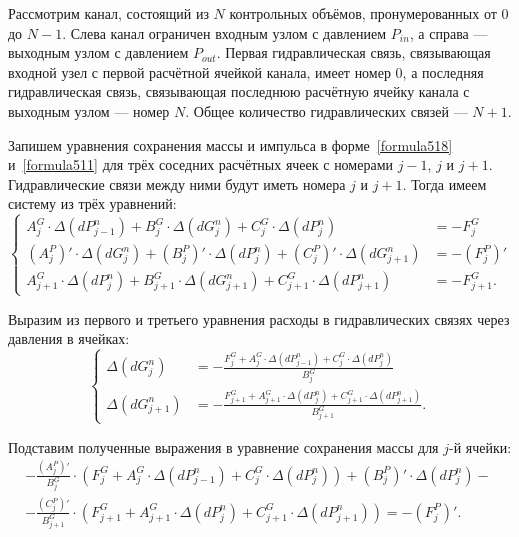 
\label{sec:subsection61}
Рассмотрим канал, состоящий из $N$ контрольных объёмов, пронумерованных от $0$ до $N-1$. Слева канал ограничен входным узлом с давлением $P_{in}$, а справа --- выходным узлом с давлением $P_{out}$. Первая гидравлическая связь, связывающая входной узел с первой расчётной ячейкой канала, имеет номер $0$, а последняя гидравлическая связь, связывающая последнюю расчётную ячейку канала с выходным узлом --- номер $N$. Общее количество гидравлических связей --- $N+1$.    

Запишем уравнения сохранения массы и импульса в форме~\eqref{formula518} и~\eqref{formula511} для трёх соседних расчётных ячеек с номерами $j-1$, $j$ и $j+1$. Гидравлические связи между ними будут иметь номера $j$ и $j+1$. Тогда имеем систему из трёх уравнений:
\begin{equation}
\label{formula61}
\left\{
\begin{aligned}
A_j^G \cdot \Delta(dP_{j-1}^n)+B_j^G \cdot \Delta(dG_j^n) + C_j^G \cdot \Delta(dP_j^n) & = -F_j^G \\
\left(A_j^P \right)' \cdot \Delta(dG_j^n) + \left(B_j^P \right)' \cdot \Delta(dP_j^n) + \left(C_j^P \right)' \cdot \Delta(dG_{j+1}^n) & = -\left(F_j^P \right)' \\
A_{j+1}^G \cdot \Delta(dP_j^n)+B_{j+1}^G \cdot \Delta(dG_{j+1}^n) + C_{j+1}^G \cdot \Delta(dP_{j+1}^n) & = -F_{j+1}^G.
\end{aligned}
\right.
\end{equation}

Выразим из первого и третьего уравнения расходы в гидравлических связях через давления в ячейках:
\begin{equation}
\label{formula62}
\left\{
\begin{aligned}
\Delta(dG_j^n) & = -\frac{F_j^G+A_j^G \cdot \Delta(dP_{j-1}^n)+C_j^G \cdot \Delta(dP_j^n)}{B_j^G} \\
\Delta(dG_{j+1}^n) & = -\frac{F_{j+1}^G+A_{j+1}^G \cdot \Delta(dP_j^n)+C_{j+1}^G \cdot \Delta(dP_{j+1}^n)}{B_{j+1}^G}.
\end{aligned}
\right.
\end{equation}

Подставим полученные выражения в уравнение сохранения массы для $j$-й ячейки:
\begin{eqnarray}
\label{formula63}
-\frac{\left(A_j^P \right)'}{B_j^G}
\cdot \left(F_j^G+A_j^G \cdot \Delta(dP_{j-1}^n)+C_j^G \cdot \Delta(dP_j^n)\right) + \left(B_j^P \right)' \cdot \Delta(dP_j^n) - \nonumber ~\\
-\frac{\left(C_j^P \right)'}{B_{j+1}^G} \cdot \left(F_{j+1}^G+A_{j+1}^G \cdot \Delta(dP_j^n)+C_{j+1}^G \cdot \Delta(dP_{j+1}^n) \right) = -\left(F_j^P \right)'.
\end{eqnarray}

